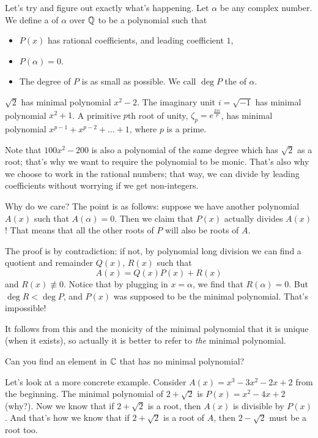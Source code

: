 Let's try and figure out exactly what's happening.
Let $\alpha$ be any complex number.
We define a  of $\alpha$ over $\mathbb Q$ to be a polynomial such that
\begin{itemize}
	\item $P(x)$ has rational coefficients, and leading coefficient $1$,
	\item $P(\alpha) = 0$.
	\item The degree of $P$ is as small as possible.
		We call $\deg P$ the  of $\alpha$.
\end{itemize}
\begin{example}
	\listhack
	\begin{enumerate}[(a)]
	\ii $\sqrt 2$ has minimal polynomial $x^2-2$.
	\ii The imaginary unit $i = \sqrt{-1}$ has minimal polynomial $x^2+1$.
	\ii A primitive $p$th root of unity, $\zeta_p = e^{\frac{2\pi i}{p}}$, has minimal polynomial $x^{p-1} + x^{p-2} + \dots + 1$, where $p$ is a prime.
	\end{enumerate}
\end{example}
Note that $100x^2 - 200$ is also a polynomial of the same degree which has $\sqrt 2$ as a root; that's why we want to require the polynomial to be monic. That's also why we choose to work in the rational numbers; that way, we can divide by leading coefficients without worrying if we get non-integers.

Why do we care? The point is as follows: suppose we have another polynomial $A(x)$ such that $A(\alpha) = 0$.
Then we claim that $P(x)$ actually divides $A(x)$!
That means that all the other roots of $P$ will also be roots of $A$.

The proof is by contradiction: if not, by polynomial long division we can find a quotient and remainder $Q(x)$, $R(x)$ such that
\[ A(x) = Q(x) P(x) + R(x) \]
and $R(x) \not\equiv 0$.
Notice that by plugging in $x = \alpha$, we find that $R(\alpha) = 0$.
But $\deg R < \deg P$, and $P(x)$ was supposed to be the minimal polynomial.
That's impossible!

It follows from this and the monicity of the minimal polynomial
that it is unique (when it exists), so actually it is better to refer to
\emph{the} minimal polynomial.
\begin{exercise}
	Can you find an element in $\mathbb C$
	that has no minimal polynomial?
\end{exercise}

Let's look at a more concrete example.
Consider $A(x) = x^3-3x^2-2x+2$ from the beginning.
The minimal polynomial of $2 + \sqrt 2$ is $P(x) = x^2 - 4x + 2$ (why?).
Now we know that if $2 + \sqrt 2$ is a root, then $A(x)$ is divisible by $P(x)$.
And that's how we know that if $2 + \sqrt 2$ is a root of $A$, then $2 - \sqrt 2$ must be a root too.

